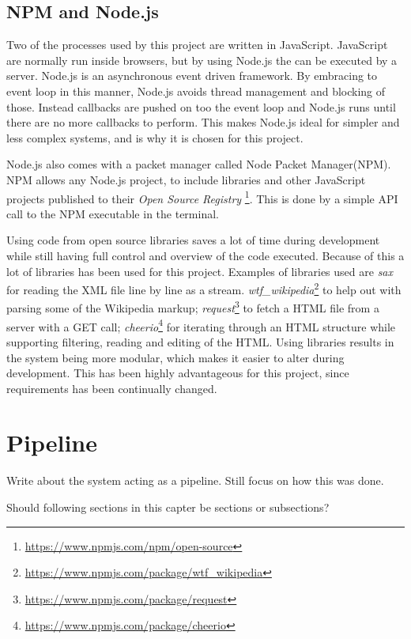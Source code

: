 \subsection{NPM and Node.js}
Two of the processes used by this project are written in JavaScript. JavaScript are normally run inside browsers, but by using Node.js\cite{node} the can be executed by a server. Node.js is an asynchronous event driven framework. By embracing to event loop in this manner, Node.js avoids thread management and blocking of those. Instead callbacks are pushed on too the event loop and Node.js runs until there are no more callbacks to perform. This makes Node.js ideal for simpler and less complex systems, and is why it is chosen for this project.

Node.js also comes with a packet manager called Node Packet Manager(NPM). NPM allows any Node.js project, to include libraries and other JavaScript projects published to their \textit{Open Source Registry} \footnote{\url{https://www.npmjs.com/npm/open-source}}. This is done by a simple API call to the NPM executable in the terminal. %

Using code from open source libraries saves a lot of time during development while still having full control and overview of the code executed. Because of this a lot of libraries has been used for this project. Examples of libraries used are \textit{sax} for reading the XML file line by line as a stream.  \textit{wtf\_wikipedia}\footnote{\url{https://www.npmjs.com/package/wtf_wikipedia}} to help out with parsing some of the Wikipedia markup;  \textit{request}\footnote{\url{https://www.npmjs.com/package/request}} to fetch a HTML file from a server with a GET call;  \textit{cheerio}\footnote{\url{https://www.npmjs.com/package/cheerio}} for iterating through an HTML structure while supporting filtering, reading and editing of the HTML. Using libraries results in the system being more modular, which makes it easier to alter during development. This has been highly advantageous for this project, since requirements has been continually changed. 

\section{Pipeline}

Write about the system acting as a pipeline.
Still focus on how this was done.

Should following sections in this capter be sections or subsections?

